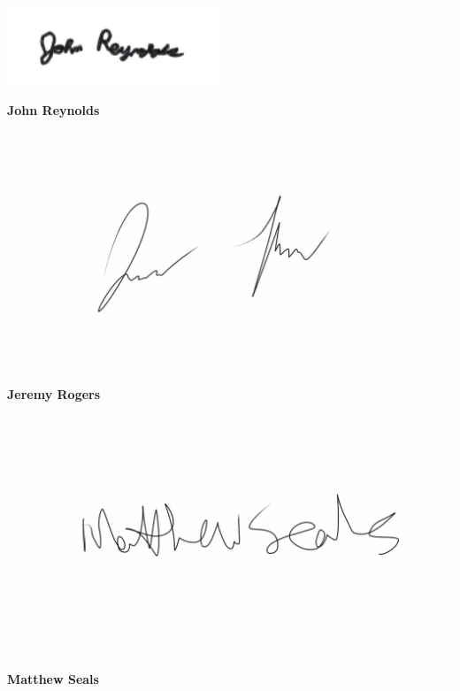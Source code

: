 \documentclass[12 pt]{article}
\begin{document}
	\includegraphics[width=0.3\linewidth]{Johnsig}
	
	\textbf{John Reynolds} \\
	
	\includegraphics[width=0.3\linewidth]{Jeremysig}
	
	\textbf{Jeremy Rogers} \\
	
	\includegraphics[width=0.3\linewidth]{Matthewsig}
	
	\textbf{Matthew Seals} 
\end{document}
